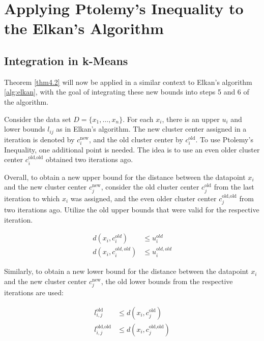 \section{Applying Ptolemy's Inequality to the Elkan's Algorithm}




\subsection{Integration in k-Means}
Theorem \ref{thm4.2} will now be applied in a similar context to Elkan's algorithm \ref{alg:elkan}, with the goal of integrating these new bounds into steps 5 and 6 of the algorithm.

Consider the data set \(D = \{x_1, \ldots, x_n\}\). For each \(x_i\), there is an upper \(u_i\) and lower bounds \(l_{ij}\) as in Elkan's algorithm. The new cluster center assigned in a iteration is denoted by \(c_i^{\text{new}}\), and the old cluster center by \(c_i^{\text{old}}\). To use Ptolemy's Inequality, one additional point is needed. The idea is to use an even older cluster center \(c_i^{\text{old,old}}\) obtained two iterations ago. 

Overall, to obtain a new upper bound for the distance between the datapoint \(x_i\) and the new cluster center \(c_j^{\text{new}}\), consider the old cluster center \(c_j^{\text{old}}\) from the last iteration to which \(x_i\) was assigned, and the even older cluster center \(c_j^{\text{old,old}}\) from two iterations ago. Utilize the old upper bounds that were valid for the respective iteration.

\begin{equation*}
\begin{aligned}
    d(x_i,c_i^{old}) &\leq u_i^{old}\\
    d(x_i,c_i^{old, old}) &\leq u_i^{old, old}
\end{aligned}
\end{equation*}

Similarly, to obtain a new lower bound for the distance between the datapoint \(x_i\) and the new cluster center \(c_j^{\text{new}}\), the old lower bounds from the respective iterations are used:

\begin{equation*}
\begin{aligned}
    l_{i,j}^{\text{old}} &\leq d(x_i, c_j^{\text{old}}) \\
    l_{i,j}^{\text{old,old}} &\leq d(x_i, c_j^{\text{old,old}})
\end{aligned}
\end{equation*}

